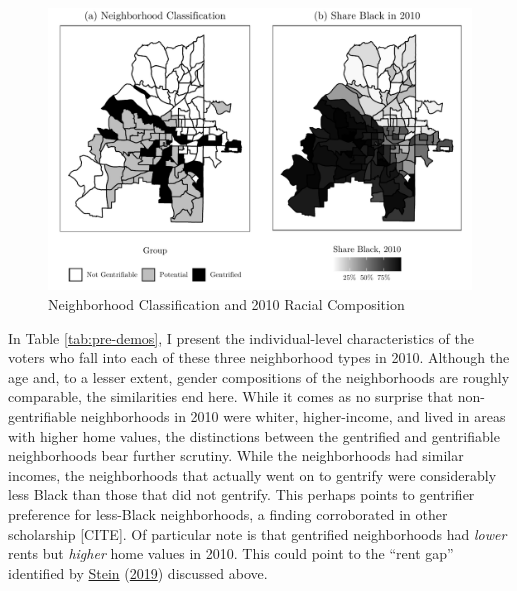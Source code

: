 \documentclass[
  12pt,
]{article}
\begin{document}
\begin{figure}[H]

{\centering \includegraphics{gentrification_files/figure-latex/maps-1} 

}

\caption{\label{fig:maps}Neighborhood Classification and 2010 Racial Composition}\label{fig:maps}
\end{figure}

In Table \ref{tab:pre-demos}, I present the individual-level characteristics of the voters who fall into each of these three neighborhood types in 2010. Although the age and, to a lesser extent, gender compositions of the neighborhoods are roughly comparable, the similarities end here. While it comes as no surprise that non-gentrifiable neighborhoods in 2010 were whiter, higher-income, and lived in areas with higher home values, the distinctions between the gentrified and gentrifiable neighborhoods bear further scrutiny. While the neighborhoods had similar incomes, the neighborhoods that actually went on to gentrify were considerably less Black than those that did not gentrify. This perhaps points to gentrifier preference for less-Black neighborhoods, a finding corroborated in other scholarship {[}CITE{]}. Of particular note is that gentrified neighborhoods had \emph{lower} rents but \emph{higher} home values in 2010. This could point to the ``rent gap'' identified by \protect\hyperlink{ref-Stein2019}{Stein} (\protect\hyperlink{ref-Stein2019}{2019}) discussed above.
\end{document}
